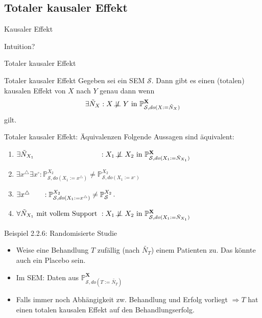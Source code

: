 \subsection{Totaler kausaler Effekt}
\begin{frame}{Kausaler Effekt}{}
    \begin{center}
       {\Huge Intuition?}
    \end{center}
\end{frame}

\begin{frame}{Totaler kausaler Effekt}
    \begin{block}{Totaler kausaler Effekt}
        Gegeben sei ein SEM $\mathcal{S}$. Dann gibt es einen
        (totalen) kausalen Effekt von $X$ nach $Y$ genau dann wenn
        \[\exists \tilde{N}_X : X \not\!\perp\!\!\!\perp Y \text{ in } \mathbb{P}_{\mathcal{S}, do(X:=\tilde{N}_X)}^{\mathbf{X}}\]
        gilt.
    \end{block}
\end{frame}

\begin{frame}{Totaler kausaler Effekt: Äquivalenzen}
    Folgende Aussagen sind äquivalent:

    \begin{enumerate}[label=(\roman*)]
        \item $\exists \tilde{N}_{X_1} \hphantom{\text{ mit vollem Support }}: X_1 \not\!\perp\!\!\!\perp X_2 \text{ in } \mathbb{P}_{\mathcal{S}, do(X_1:=\tilde{N}_{X_1})}^{\mathbf{X}}$
        \item $\exists x^\triangle \exists x^\square: \mathbb{P}_{\mathcal{S}, do(X_1:=x^\triangle)}^{X_2} \neq \mathbb{P}_{\mathcal{S}, do(X_1:=x^\square)}^{X_2}$
        \item $\exists x^\triangle \hphantom{\exists x^\square}: \mathbb{P}_{\mathcal{S}, do(X_1:=x^\triangle)}^{X_2} \neq \mathbb{P}_\mathcal{S}^{X_2}$.
        \item $\forall \tilde{N}_{X_1} \text{ mit vollem Support }: X_1 \not\!\perp\!\!\!\perp X_2 \text{ in } \mathbb{P}_{\mathcal{S}, do(X_1:=\tilde{N}_{X_1})}^{\mathbf{X}}$
    \end{enumerate}
\end{frame}

\begin{frame}{Beispiel 2.2.6: Randomisierte Studie}
    \begin{itemize}
        \item<1-> Weise eine Behandlung $T$ zufällig (nach $\tilde{N_T}$) einem
              Patienten zu. Das könnte auch ein Placebo sein.
        \item<2-> Im SEM: Daten aus $\mathbb{P}_{\mathcal{S}, do(T:=\tilde{N_T})}^{\mathbf{X}}$
        \item<3-> Falls immer noch Abhängigkeit zw. Behandlung und Erfolg
              vorliegt $\Rightarrow T$ hat einen totalen kausalen Effekt auf
              den Behandlungserfolg.
    \end{itemize}
\end{frame}

